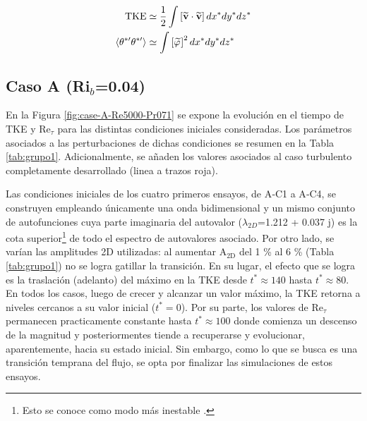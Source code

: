 \begin{align}
\text{TKE} &\simeq \frac{1}{2} \int \left[ \widetilde{\mathbf{v}} \cdot \widetilde{\mathbf{v}} \right] dx^* dy^* dz^* 
\label{eq:tke-calc}\\
\langle \theta^{* \prime} \theta^{* \prime} \rangle  &\simeq \int \left[ \widetilde{\varphi} \hspace{0.2mm} \right]^2 dx^* dy^* dz^* 
\label{eq:varteta-calc}
\end{align}  


\subsection{Caso A (Ri$_b$=0.04)}

En la Figura \ref{fig:case-A-Re5000-Pr071} se expone la evolución en el tiempo de TKE y Re$_{\tau}$ para las distintas condiciones iniciales consideradas. Los parámetros asociados a las perturbaciones de dichas condiciones se resumen en la Tabla \ref{tab:grupo1}. Adicionalmente, se añaden los valores asociados al caso turbulento completamente desarrollado (linea a trazos roja).  

Las condiciones iniciales de los cuatro primeros ensayos, de A‑C1 a A‑C4, se construyen empleando únicamente una onda bidimensional y un mismo conjunto de autofunciones cuya parte imaginaria del autovalor ($\lambda_{2D}$=1.212 + 0.037 j) es la cota superior\footnote{Esto  se conoce como modo más inestable \cite{schmid}.} de todo el espectro de autovalores asociado. Por otro lado, se varían las amplitudes 2D utilizadas: al aumentar A$_\text{2D}$ del 1 \% al 6 \% (Tabla \ref{tab:grupo1})  no se logra gatillar la transición. En su lugar, el efecto que se logra es la traslación (adelanto) del máximo en la TKE desde $t^* \approx 140$ hasta $t^* \approx 80$. En todos los casos, luego de crecer y alcanzar un valor máximo, la TKE retorna a niveles cercanos a su valor inicial ($t^*=0$). Por su parte, los valores de Re$_{\tau}$ permanecen practicamente constante hasta $t^* \approx 100$ donde comienza un descenso de la magnitud y posteriormentes tiende a recuperarse y evolucionar, aparentemente, hacia su estado inicial. Sin embargo, como lo que se busca es una transición temprana del flujo, se opta por finalizar las simulaciones de estos ensayos.  

